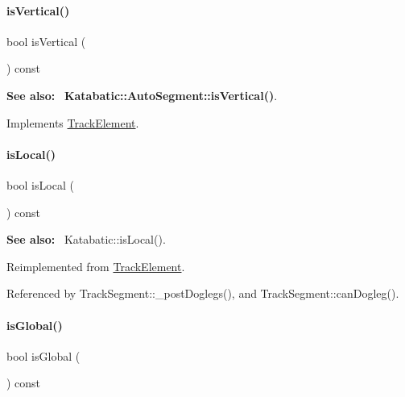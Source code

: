 \paragraph{\texorpdfstring{is\+Vertical()}{isVertical()}}
{\footnotesize\ttfamily bool is\+Vertical (\begin{DoxyParamCaption}{ }\end{DoxyParamCaption}) const\hspace{0.3cm}{\ttfamily [virtual]}}

{\bfseries See also\+:}~ \textbf{ Katabatic\+::\+Auto\+Segment\+::is\+Vertical()}. 

Implements \mbox{\hyperlink{classKite_1_1TrackElement_a6fa2bf0568a2b295dd7cd1f7207247d5}{Track\+Element}}.

\mbox{\label{classKite_1_1TrackSegment_add556a145a89fdbcea82346abfb873dc}} 
\paragraph{\texorpdfstring{is\+Local()}{isLocal()}}
{\footnotesize\ttfamily bool is\+Local (\begin{DoxyParamCaption}{ }\end{DoxyParamCaption}) const\hspace{0.3cm}{\ttfamily [virtual]}}

{\bfseries See also\+:}~ Katabatic\+::is\+Local(). 

Reimplemented from \mbox{\hyperlink{classKite_1_1TrackElement_add556a145a89fdbcea82346abfb873dc}{Track\+Element}}.



Referenced by Track\+Segment\+::\+\_\+post\+Doglegs(), and Track\+Segment\+::can\+Dogleg().

\mbox{\label{classKite_1_1TrackSegment_a19ba379112d6b29faa45c5eefbf38500}} 
\paragraph{\texorpdfstring{is\+Global()}{isGlobal()}}
{\footnotesize\ttfamily bool is\+Global (\begin{DoxyParamCaption}{ }\end{DoxyParamCaption}) const\hspace{0.3cm}{\ttfamily [virtual]}}

